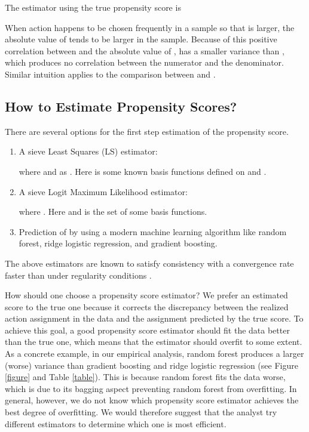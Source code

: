 \documentclass[letterpaper]{article} \usepackage{aaai19}  \usepackage{times}  \usepackage{helvet}  \usepackage{courier}  \usepackage{url}  \usepackage{graphicx}  \frenchspacing  \usepackage{comment}
\newcommand{\citep}{\cite}
\begin{document}
The estimator using the true propensity score is

When action  happens to be chosen frequently in a sample so that  is larger, the absolute value of  tends to be larger in the sample.
Because of this positive correlation between  and the absolute value of ,  has a smaller variance than , which produces no correlation between the numerator and the denominator.
Similar intuition applies to the comparison between  and . 



\subsection{How to Estimate Propensity Scores?}\label{section:pscore}
There are several options for the first step estimation of the propensity score.
\begin{enumerate}
	\item A sieve Least Squares (LS) estimator:
	
	where  and  as . 
	Here  is some known basis functions defined on  and .
	\item A sieve Logit Maximum Likelihood estimator:
	
	where
	.
	Here  and  is the set of some basis functions.
	\item Prediction of  by  using a modern machine learning algorithm like random forest, ridge logistic regression, and gradient boosting. 
\end{enumerate}

The above estimators are known to satisfy consistency with a convergence rate faster than  under regularity conditions \citep{Newey1997,cattaneo2010efficient,knight2000asymptotics,blanchard2003rate,buhlmann2011statistics,wager2017estimation}. 

How should one choose a propensity score estimator?
We prefer an estimated score to the true one because it corrects the discrepancy between the realized action assignment in the data and the assignment predicted by the true score.
To achieve this goal, a good propensity score estimator should fit the data better than the true one, which means that the estimator should overfit to some extent.
As a concrete example, in our empirical analysis, random forest produces a larger (worse) variance than gradient boosting and ridge logistic regression (see Figure \ref{figure} and Table \ref{table}).
This is because random forest fits the data worse, which is due to its bagging aspect preventing random forest from overfitting.
In general, however, we do not know which propensity score estimator achieves the best degree of overfitting.
We would therefore suggest that the analyst try different estimators to determine which one is most efficient.
\end{document}
